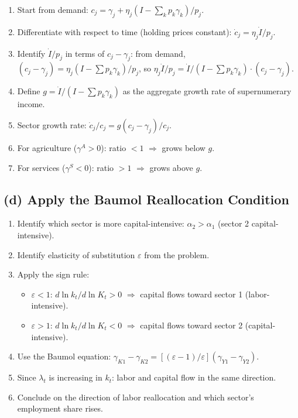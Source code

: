 \documentclass[a4paper,11pt]{article}
\begin{document}
\begin{enumerate}
    \item Start from demand: $c_j = \gamma_j + \eta_j (I - \sum_k p_k \gamma_k)/p_j$.
    \item Differentiate with respect to time (holding prices constant): $\dot{c}_j = \eta_j \dot{I}/p_j$.
    \item Identify $\dot{I}/p_j$ in terms of $c_j - \gamma_j$: from demand, $(c_j - \gamma_j) = \eta_j(I - \sum p_k \gamma_k)/p_j$, so $\eta_j \dot{I}/p_j = \dot{I}/(I - \sum p_k \gamma_k) \cdot (c_j - \gamma_j)$.
    \item Define $g = \dot{I}/(I - \sum p_k \gamma_k)$ as the aggregate growth rate of supernumerary income.
    \item Sector growth rate: $\dot{c}_j/c_j = g (c_j - \gamma_j)/c_j$.
    \item For agriculture ($\gamma^A > 0$): ratio $< 1$ $\Rightarrow$ grows below $g$.
    \item For services ($\gamma^S < 0$): ratio $> 1$ $\Rightarrow$ grows above $g$.
\end{enumerate}

\subsection*{(d) Apply the Baumol Reallocation Condition}

\begin{enumerate}
    \item Identify which sector is more capital-intensive: $\alpha_2 > \alpha_1$ (sector 2 capital-intensive).
    \item Identify elasticity of substitution $\varepsilon$ from the problem.
    \item Apply the sign rule:
    \begin{itemize}
        \item $\varepsilon < 1$: $d\ln k_t / d\ln K_t > 0$ $\Rightarrow$ capital flows toward sector 1 (labor-intensive).
        \item $\varepsilon > 1$: $d\ln k_t / d\ln K_t < 0$ $\Rightarrow$ capital flows toward sector 2 (capital-intensive).
    \end{itemize}
    \item Use the Baumol equation: $\gamma_{K1} - \gamma_{K2} = [(\varepsilon-1)/\varepsilon](\gamma_{Y1} - \gamma_{Y2})$.
    \item Since $\lambda_t$ is increasing in $k_t$: labor and capital flow in the same direction.
    \item Conclude on the direction of labor reallocation and which sector's employment share rises.
\end{enumerate}
\end{document}
